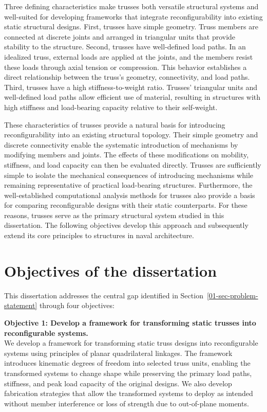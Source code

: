 Three defining characteristics make trusses both versatile structural systems and well-suited for developing frameworks that integrate reconfigurability into existing static structural designs. First, trusses have simple geometry. Truss members are connected at discrete joints and arranged in triangular units that provide stability to the structure. Second, trusses have well-defined load paths. In an idealized truss, external loads are applied at the joints, and the members resist these loads through axial tension or compression. This behavior establishes a direct relationship between the truss's geometry, connectivity, and load paths. Third, trusses have a high stiffness-to-weight ratio. Trusses' triangular units and well-defined load paths allow efficient use of material, resulting in structures with high stiffness and load-bearing capacity relative to their self-weight.

These characteristics of trusses provide a natural basis for introducing reconfigurability into an existing structural topology. Their simple geometry and discrete connectivity enable the systematic introduction of mechanisms by modifying members and joints. The effects of these modifications on mobility, stiffness, and load capacity can then be evaluated directly. Trusses are sufficiently simple to isolate the mechanical consequences of introducing mechanisms while remaining representative of practical load-bearing structures. Furthermore, the well-established computational analysis methods for trusses also provide a basis for comparing reconfigurable designs with their static counterparts. For these reasons, trusses serve as the primary structural system studied in this dissertation. The following objectives develop this approach and subsequently extend its core principles to structures in naval architecture.

\section{Objectives of the dissertation}\label{01-sec-objectives}
This dissertation addresses the central gap identified in Section~\ref{01-sec-problem-statement} through four objectives:

\noindent{}\textbf{Objective 1: Develop a framework for transforming static trusses into reconfigurable systems.}\\
We develop a framework for transforming static truss designs into reconfigurable systems using principles of planar quadrilateral linkages. The framework introduces kinematic degrees of freedom into selected truss units, enabling the transformed systems to change shape while preserving the primary load paths, stiffness, and peak load capacity of the original designs. We also develop fabrication strategies that allow the transformed systems to deploy as intended without member interference or loss of strength due to out-of-plane moments.

